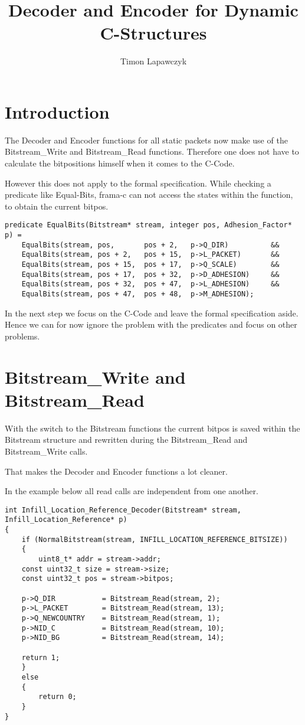 \documentclass[parskip=half,paper=a4,DIV=13]{scrartcl}
\title{Decoder and Encoder for Dynamic C-Structures}
\author{Timon Lapawczyk}
\begin{document}
\maketitle

\section{Introduction}

The Decoder and Encoder functions for all static packets now make use of the Bitstream\_Write
and Bitstream\_Read functions. Therefore one does not have to calculate the bitpositions himself
when it comes to the C-Code.

However this does not apply to the formal specification.
While checking a predicate like Equal-Bits, frama-c can not access the states within the function,
to obtain the current bitpos.

\begin{lstlisting}[mathescape]
predicate EqualBits(Bitstream* stream, integer pos, Adhesion_Factor* p) =
    EqualBits(stream, pos,       pos + 2,   p->Q_DIR)          &&
    EqualBits(stream, pos + 2,   pos + 15,  p->L_PACKET)       &&
    EqualBits(stream, pos + 15,  pos + 17,  p->Q_SCALE)        &&
    EqualBits(stream, pos + 17,  pos + 32,  p->D_ADHESION)     &&
    EqualBits(stream, pos + 32,  pos + 47,  p->L_ADHESION)     &&
    EqualBits(stream, pos + 47,  pos + 48,  p->M_ADHESION);
\end{lstlisting}

In the next step we focus on the C-Code and leave the formal specification aside.
Hence we can for now ignore the problem with the predicates and focus on other problems.

\section{Bitstream\_Write and Bitstream\_Read}

With the switch to the Bitstream functions the current bitpos is saved within the Bitstream
structure and rewritten during the Bitstream\_Read and Bitstream\_Write calls.

That makes the Decoder and Encoder functions a lot cleaner.

In the example below all read calls are independent from one another.

\begin{lstlisting}[mathescape]
int Infill_Location_Reference_Decoder(Bitstream* stream, Infill_Location_Reference* p)
{
    if (NormalBitstream(stream, INFILL_LOCATION_REFERENCE_BITSIZE))
    {
        uint8_t* addr = stream->addr;
	const uint32_t size = stream->size;
	const uint32_t pos = stream->bitpos;

	p->Q_DIR           = Bitstream_Read(stream, 2);
	p->L_PACKET        = Bitstream_Read(stream, 13);
	p->Q_NEWCOUNTRY    = Bitstream_Read(stream, 1);
	p->NID_C           = Bitstream_Read(stream, 10);
	p->NID_BG          = Bitstream_Read(stream, 14);

	return 1;
    }
    else
    {
        return 0;
    }
}
\end{lstlisting}
\end{document}
